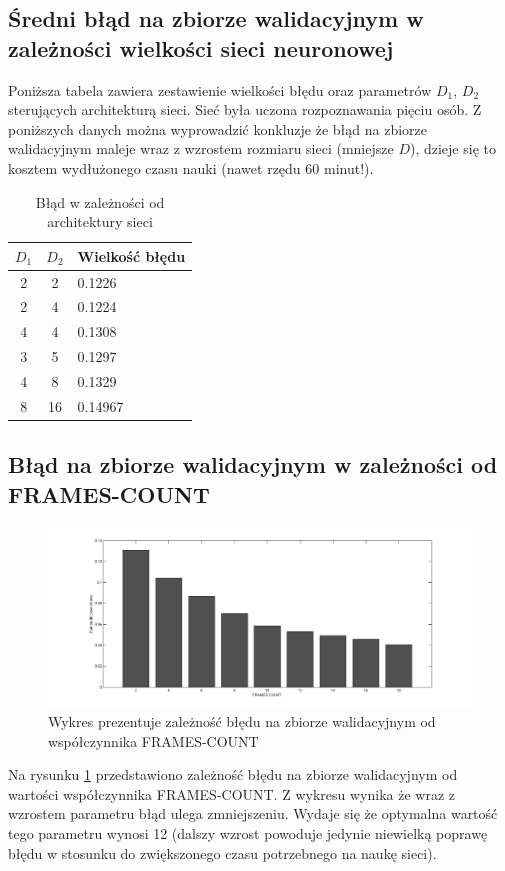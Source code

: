 \documentclass[a4paper]{article}
\begin{document}
	\subsection{Średni błąd na zbiorze walidacyjnym w zależności wielkości sieci neuronowej}
		Poniższa tabela zawiera zestawienie wielkości błędu oraz parametrów $D_1$, $D_2$ 
		sterujących architekturą sieci. Sieć była uczona rozpoznawania pięciu osób.
		Z poniższych danych można wyprowadzić konkluzje że błąd na zbiorze walidacyjnym 
		maleje wraz z wzrostem rozmiaru sieci (mniejsze $D$), dzieje się to kosztem 
		wydłużonego czasu nauki (nawet rzędu 60 minut!).
		\begin{table}[h]
			\centering
			\begin{tabular}{|c|c|p{6cm}|}
				\hline
				$D_1$ & $D_2$ & Wielkość błędu \\
				\hline \hline
				\hline
					2 & 2 & 0.1226 \\
				\hline
					2 & 4 & 0.1224 \\
				\hline
					4 	& 4 & 0.1308 \\
				\hline
					3 & 5 & 0.1297 \\
				\hline
					4 & 8 & 0.1329 \\
				\hline
					8 & 16 & 0.14967 \\
				\hline
			\end{tabular}			
			\caption{Błąd w zależności od architektury sieci}
			\label{tab:srparams}
		\end{table}
		
	\subsection{Błąd na zbiorze walidacyjnym w zależności od FRAMES-COUNT}
	\begin{figure}[h]	
  		\centering
		\includegraphics[width=\textwidth,trim= 3cm 0cm 3cm 0cm, clip]{./img/mfcc}
  		\caption{Wykres prezentuje zależność błędu na zbiorze walidacyjnym od współczynnika
  		FRAMES-COUNT}
  		\label{fig:mfcc1}
	\end{figure}
	Na rysunku \ref{fig:mfcc1} przedstawiono zależność błędu na zbiorze walidacyjnym od wartości 
	współczynnika FRAMES-COUNT. Z wykresu wynika że wraz z wzrostem parametru błąd ulega zmniejszeniu.
	Wydaje się że optymalna wartość tego parametru wynosi 12 (dalszy wzrost powoduje jedynie niewielką
	poprawę błędu w stosunku do zwiększonego czasu potrzebnego na naukę sieci).
		
\end{document}
